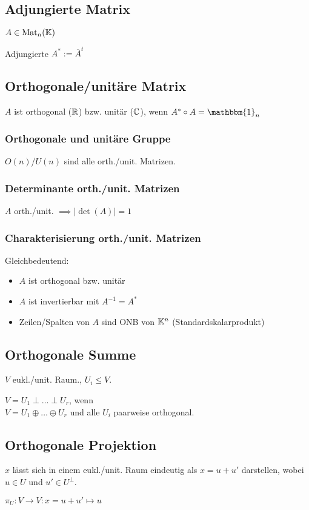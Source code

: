 \subsection*{Adjungierte Matrix}
$A\in\operatorname{Mat}_n(\mathbb{K})$

Adjungierte $A^* := \overline{A}^t$

\subsection*{Orthogonale/unitäre Matrix}
$A$ ist orthogonal ($\mathbb{R}$) bzw. unitär ($\mathbb{C}$), wenn $A^* \circ A = \mathbbm{1}_n$

\subsubsection*{Orthogonale und unitäre Gruppe}
$O(n)$/$U(n)$ sind alle orth./unit. Matrizen.

\subsubsection*{Determinante orth./unit. Matrizen}
$A$ orth./unit. $\implies |\det(A)|=1$

\subsubsection*{Charakterisierung orth./unit. Matrizen}
Gleichbedeutend:
\begin{itemize}
	\item $A$ ist orthogonal bzw. unitär
	\item $A$ ist invertierbar mit $A^{-1}=A^*$
	\item Zeilen/Spalten von $A$ sind ONB von $\mathbb{K}^n$ (Standardskalarprodukt)
\end{itemize}

\subsection*{Orthogonale Summe}
$V$ eukl./unit. Raum., $U_i \le V$.

$V = U_1 \perp \dots \perp U_r$, wenn \\
$V = U_1 \oplus \dots \oplus U_r$ und alle $U_i$ paarweise orthogonal.

\subsection*{Orthogonale Projektion}
$x$ lässt sich in einem eukl./unit. Raum eindeutig als
$x=u+u'$ darstellen, wobei $u\in U$ und $u' \in U^\perp$.

$\pi_U:V\to V: x=u+u' \mapsto u$
